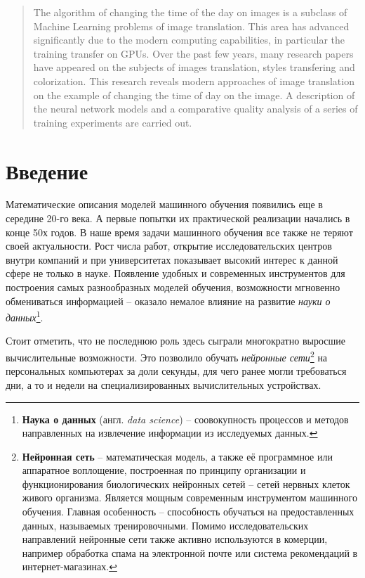 \documentclass[11pt,a4paper]{extarticle}
\begin{document}
\begin{abstract}
	The algorithm of changing the time of the day on images is a subclass of Machine Learning problems of image translation.
	This area has advanced significantly due to the modern computing capabilities, in particular the training transfer on GPUs.
	Over the past few years, many research papers have appeared on the subjects of images translation, styles transfering and colorization.
	This research reveals modern approaches of image translation on the example of changing the time of day on the image.
	A description of the neural network models and a comparative quality analysis of a series of training experiments are carried out.
\end{abstract}

\newpage
\tableofcontents
\newpage

\section{Введение}
	Математические описания моделей машинного обучения появились еще в середине 20-го века.
	А первые попытки их практической реализации начались в конце 50х годов.
	В наше время задачи машинного обучения все также не теряют своей актуальности.
	Рост числа работ, открытие исследовательских центров внутри компаний и при университетах показывает высокий интерес к данной сфере не только в науке.
	Появление удобных и современных инструментов для построения самых разнообразных моделей обучения,
	возможности мгновенно обмениваться информацией -- оказало немалое влияние на развитие \textit{науки о данных}\footnote{
		\textbf{Наука о данных} (англ. \textit{data science}) -- соовокупность процессов и методов направленных на извлечение информации из исследуемых данных.
	}.  
	
	Стоит отметить, что не последнюю роль здесь сыграли многократно выросшие вычислительные возможности. 
	Это позволило обучать \textit{нейронные сети}\footnote{
		\textbf{Нейронная сеть} --  математическая модель, а также её программное или аппаратное воплощение, 
		построенная по принципу организации и функционирования биологических нейронных сетей -- сетей нервных клеток живого организма.
		Является мощным современным инструментом машинного обучения.
		Главная особенность -- способность обучаться на предоставленных данных, называемых тренировочными.
		Помимо исследовательских направлений нейронные сети также активно используются в комерции, например обработка спама на электронной почте или система рекомендаций в интернет-магазинах.
	} на персональных компьютерах за доли секунды, для чего ранее могли требоваться дни, а то и недели на специализированных вычислительных устройствах.
\end{document}
